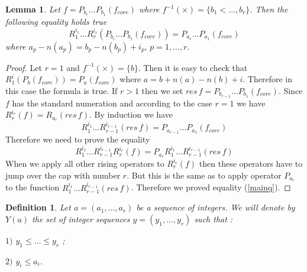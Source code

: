 \documentclass[12pt,reqno]{amsart}
\newtheorem{lemma}[thm]{Lemma}
\newtheorem{definition}[thm]{Definition}
\begin{document}
 
\begin{lemma}\label{main2}   Let  $f=P_{b_r}\dots P_{b_1}(f_{core})$ where $f^{-1}(\times)=\{b_1<\dots,b_r\}$. Then  the following equality holds true
\begin{equation}\label{mainq}
R_1^{i_1}\dots R_r^{i_r}(P_{b_r}\dots P_{b_1}(f_{core}))=P_{a_r}\dots P_{a_1}(f_{core})
\end{equation}
where $a_p-n(a_p)=b_p-n(b_p)+i_p,\,p=1,\dots,r.$
\end{lemma}
\begin{proof}
Let $r=1$ and $f^{-1}(\times)=\{b\}$. Then  it is easy to check that  $R_1^{i}(P_b(f_{core}))=P_a(f_{core})$ where
$
a= b +n(a)-n(b)+i.
$
 Therefore in this case the formula is true. If $r>1$ then we  set $res\, f= P_{b_{r-1}}\dots P_{b_1}(f_{core})$. Since  $f$ has the standard numeration  and according to the case $r=1$  we have $R_{r}^{i_r}(f)=R_{a_r}(res\,f)$. By induction we have   
$$
R_1^{i_1}\dots R_{r-1}^{i_{r-1}}(res\,f)= P_{a_{r-1}}\dots P_{a_1}(f_{core})
$$
Therefore we need to prove the equality$$
R_1^{i_1}\dots R_{r-1}^{i_{r-1}}R_r^{i_r}(f)= P_{a_r}R_1^{i_1}\dots R^{i_{r-1}}_{r-1}(res\,f)
$$
When we apply all other rising operators  to $R_{r}^{i_r}(f)$ then these  operators have to jump  over the cap with number $r$. But this is the same as to apply operator  $P_{a_r}$ to the function  $R_1^{i_1}\dots R_{r-1}^{i_{r-1}}(res\,f)$. Therefore we proved equality (\ref{mainq}).
\end{proof}

\begin{definition} Let $a=(a_1,\dots,a_r)$ be a sequence of integers.
We will denote by $Y(a)$ the set of  integer sequences  $y=(y_1,\dots,y_r)$  such that : 

$1)$ $ y_1\le\dots\le y_r$ ;

$2)$   $ y_i\le a_i$.

\end{definition}
\end{document}
